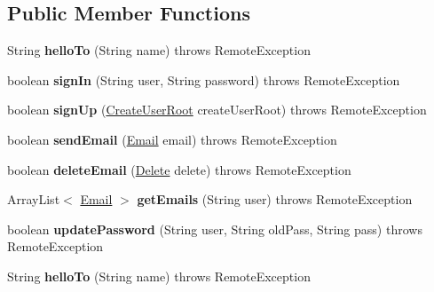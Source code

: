 \subsection*{Public Member Functions}
\begin{DoxyCompactItemize}
\item 
\mbox{\label{interface_r_m_i_interface_a44a3680b28462fce581d362dbc6cf1db}} 
String {\bfseries hello\+To} (String name)  throws Remote\+Exception
\item 
\mbox{\label{interface_r_m_i_interface_a826db0ba8f0814985cfa911ef76a68cc}} 
boolean {\bfseries sign\+In} (String user, String password)  throws Remote\+Exception
\item 
\mbox{\label{interface_r_m_i_interface_a39fbf15bb1115837ce6025aaa47784bb}} 
boolean {\bfseries sign\+Up} (\hyperlink{class_create_user_root}{Create\+User\+Root} create\+User\+Root)  throws Remote\+Exception
\item 
\mbox{\label{interface_r_m_i_interface_ad86e01382cdb0cb8a64710a7e9102524}} 
boolean {\bfseries send\+Email} (\hyperlink{class_email}{Email} email)  throws Remote\+Exception
\item 
\mbox{\label{interface_r_m_i_interface_a86bc2a5cb0bdb04a1aeb9b36e373cd5e}} 
boolean {\bfseries delete\+Email} (\hyperlink{class_delete}{Delete} delete)  throws Remote\+Exception
\item 
\mbox{\label{interface_r_m_i_interface_ad326010c8c132dd3398a4443cf827601}} 
Array\+List$<$ \hyperlink{class_email}{Email} $>$ {\bfseries get\+Emails} (String user)  throws Remote\+Exception
\item 
\mbox{\label{interface_r_m_i_interface_a643b5963469fbc121032c7d75c01c7b9}} 
boolean {\bfseries update\+Password} (String user, String old\+Pass, String pass)  throws Remote\+Exception
\item 
\mbox{\label{interface_r_m_i_interface_a44a3680b28462fce581d362dbc6cf1db}} 
String {\bfseries hello\+To} (String name)  throws Remote\+Exception

\end{DoxyCompactItemize}

